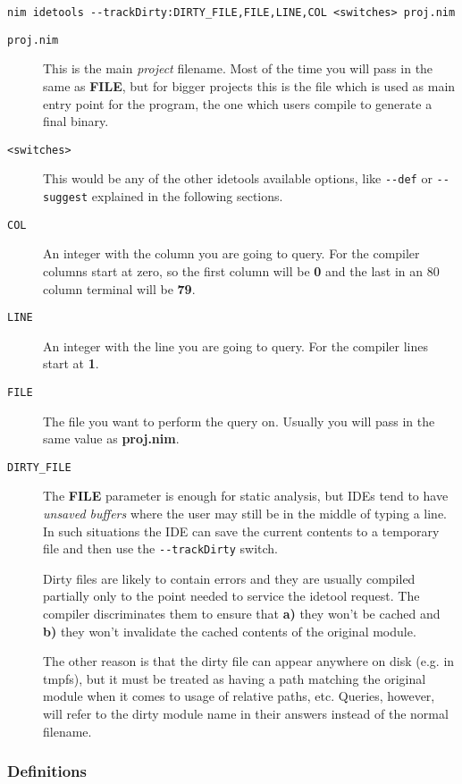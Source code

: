 \begin{verbatim}
nim idetools --trackDirty:DIRTY_FILE,FILE,LINE,COL <switches> proj.nim
\end{verbatim}

\begin{description}
\item[\texttt{proj.nim}]
This is the main \emph{project} filename. Most of the time you will pass
in the same as \textbf{FILE}, but for bigger projects this is the file
which is used as main entry point for the program, the one which users
compile to generate a final binary.
\item[\texttt{\textless{}switches\textgreater{}}]
This would be any of the other idetools available options, like
\texttt{-\/-def} or \texttt{-\/-suggest} explained in the following
sections.
\item[\texttt{COL}]
An integer with the column you are going to query. For the compiler
columns start at zero, so the first column will be \textbf{0} and the
last in an 80 column terminal will be \textbf{79}.
\item[\texttt{LINE}]
An integer with the line you are going to query. For the compiler lines
start at \textbf{1}.
\item[\texttt{FILE}]
The file you want to perform the query on. Usually you will pass in the
same value as \textbf{proj.nim}.
\item[\texttt{DIRTY\_FILE}]
The \textbf{FILE} parameter is enough for static analysis, but IDEs tend
to have \emph{unsaved buffers} where the user may still be in the middle
of typing a line. In such situations the IDE can save the current
contents to a temporary file and then use the \texttt{-\/-trackDirty}
switch.

Dirty files are likely to contain errors and they are usually compiled
partially only to the point needed to service the idetool request. The
compiler discriminates them to ensure that \textbf{a)} they won't be
cached and \textbf{b)} they won't invalidate the cached contents of the
original module.

The other reason is that the dirty file can appear anywhere on disk
(e.g. in tmpfs), but it must be treated as having a path matching the
original module when it comes to usage of relative paths, etc. Queries,
however, will refer to the dirty module name in their answers instead of
the normal filename.
\end{description}

\hypertarget{definitions}{%
\subsubsection{Definitions}\label{definitions}}

